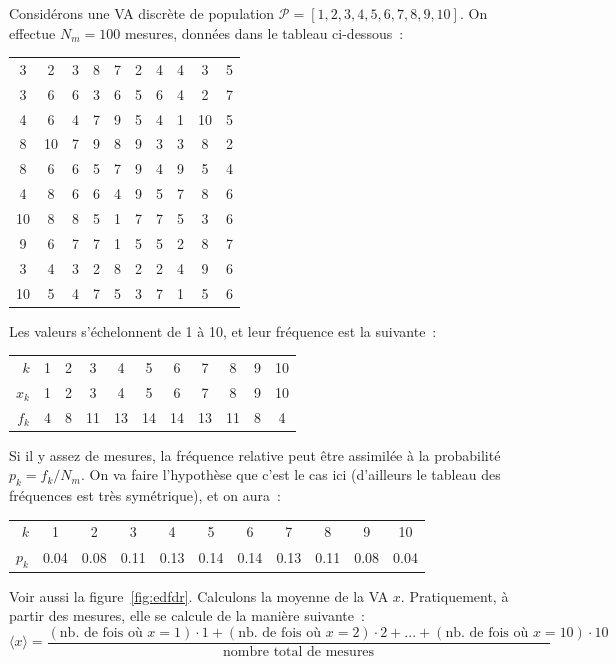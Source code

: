 Considérons une VA discrète de population $\mathcal{P}=[1,2,3,4,5,6,7,8,9,10]$. On effectue $N_m=100$ mesures, données dans le tableau ci-dessous~:
\begin{center}
\begin{tabular}{cccccccccc}
 3 &  2 &  3 &  8 &  7 &  2 &  4 &  4 &  3 &  5 \\
 3 &  6 &  6 &  3 &  6 &  5 &  6 &  4 &  2 &  7 \\
 4 &  6 &  4 &  7 &  9 &  5 &  4 &  1 & 10 &  5 \\
 8 & 10 &  7 &  9 &  8 &  9 &  3 &  3 &  8 &  2 \\
 8 &  6 &  6 &  5 &  7 &  9 &  4 &  9 &  5 &  4 \\
 4 &  8 &  6 &  6 &  4 &  9 &  5 &  7 &  8 &  6 \\
10 &  8 &  8 &  5 &  1 &  7 &  7 &  5 &  3 &  6 \\
 9 &  6 &  7 &  7 &  1 &  5 &  5 &  2 &  8 &  7 \\
 3 &  4 &  3 &  2 &  8 &  2 &  2 &  4 &  9 &  6 \\
10 &  5 &  4 &  7 &  5 &  3 &  7 &  1 &  5 &  6
\end{tabular}
\end{center}
Les valeurs s'échelonnent de 1 à 10, et leur fréquence est la suivante~:
\begin{center}
\begin{tabular}{r|cccccccccc}
$k$   & 1 & 2 & 3 & 4 & 5 & 6 & 7 & 8 & 9 & 10 \\
$x_k$ & 1 & 2 & 3 & 4 & 5 & 6 & 7 & 8 & 9 & 10 \\
$f_k$ & 4 & 8 & 11 & 13 & 14 & 14 & 13 & 11 & 8 & 4
\end{tabular}
\end{center}
Si il y assez de mesures, la fréquence relative peut être assimilée à la probabilité $p_k=f_k/N_m$. On va faire l'hypothèse que c'est le cas ici (d'ailleurs le tableau des fréquences est très symétrique), et on aura~:
\begin{center}
\begin{tabular}{r|cccccccccc}
$k$   & 1 & 2 & 3 & 4 & 5 & 6 & 7 & 8 & 9 & 10 \\
$p_k$ & 0.04 & 0.08 & 0.11 & 0.13 & 0.14 & 0.14 & 0.13 & 0.11 & 0.08 & 0.04
\end{tabular}
\end{center}
Voir aussi la figure~\ref{fig:edfdr}. Calculons la moyenne de la VA $x$. Pratiquement, à partir des mesures, elle se calcule de la manière suivante~:
\begin{equation*}
\langle x\rangle=\frac{
(\text{nb. de fois où $x\!=\!1$})\!\cdot\!1 +
(\text{nb. de fois où $x\!=\!2$})\!\cdot\!2 + ... +
(\text{nb. de fois où $x\!=\!10$})\!\cdot\!10}{\text{nombre total de mesures}}
\end{equation*}
